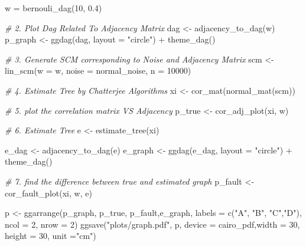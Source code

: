 \documentclass[
  10pt,
]{article}
\newenvironment{Shaded}{\begin{snugshade}}{\end{snugshade}}
\newcommand{\AttributeTok}[1]{\textcolor[rgb]{0.77,0.63,0.00}{#1}}
\newcommand{\CommentTok}[1]{\textcolor[rgb]{0.56,0.35,0.01}{\textit{#1}}}
\newcommand{\DecValTok}[1]{\textcolor[rgb]{0.00,0.00,0.81}{#1}}
\newcommand{\FloatTok}[1]{\textcolor[rgb]{0.00,0.00,0.81}{#1}}
\newcommand{\FunctionTok}[1]{\textcolor[rgb]{0.00,0.00,0.00}{#1}}
\newcommand{\NormalTok}[1]{#1}
\newcommand{\OtherTok}[1]{\textcolor[rgb]{0.56,0.35,0.01}{#1}}
\newcommand{\SpecialCharTok}[1]{\textcolor[rgb]{0.00,0.00,0.00}{#1}}
\newcommand{\StringTok}[1]{\textcolor[rgb]{0.31,0.60,0.02}{#1}}
\begin{document}
\begin{Shaded}
\begin{Highlighting}[]
\NormalTok{w }\OtherTok{=} \FunctionTok{bernouli\_dag}\NormalTok{(}\DecValTok{10}\NormalTok{, }\FloatTok{0.4}\NormalTok{)}

\CommentTok{\# 2. Plot Dag Related To Adjacency Matrix}
\NormalTok{dag }\OtherTok{\textless{}{-}} \FunctionTok{adjacency\_to\_dag}\NormalTok{(w)}
\NormalTok{p\_graph }\OtherTok{\textless{}{-}} \FunctionTok{ggdag}\NormalTok{(dag, }\AttributeTok{layout =} \StringTok{"circle"}\NormalTok{) }\SpecialCharTok{+} \FunctionTok{theme\_dag}\NormalTok{()}

\CommentTok{\# 3. Generate SCM corresponding to Noise and Adjacency Matrix}
\NormalTok{scm }\OtherTok{\textless{}{-}} \FunctionTok{lin\_scm}\NormalTok{(}\AttributeTok{w =}\NormalTok{ w, }\AttributeTok{noise =}\NormalTok{ normal\_noise, }\AttributeTok{n =} \DecValTok{10000}\NormalTok{)}

\CommentTok{\# 4. Estimate Tree by Chatterjee Algorithms}
\NormalTok{xi }\OtherTok{\textless{}{-}} \FunctionTok{cor\_mat}\NormalTok{(}\FunctionTok{normal\_mat}\NormalTok{(scm))}

\CommentTok{\# 5. plot the correlation matrix VS Adjacency}
\NormalTok{p\_true }\OtherTok{\textless{}{-}} \FunctionTok{cor\_adj\_plot}\NormalTok{(xi, w)}

\CommentTok{\# 6. Estimate Tree}
\NormalTok{e }\OtherTok{\textless{}{-}} \FunctionTok{estimate\_tree}\NormalTok{(xi)}

\NormalTok{e\_dag }\OtherTok{\textless{}{-}} \FunctionTok{adjacency\_to\_dag}\NormalTok{(e)}
\NormalTok{e\_graph }\OtherTok{\textless{}{-}} \FunctionTok{ggdag}\NormalTok{(e\_dag, }\AttributeTok{layout =} \StringTok{"circle"}\NormalTok{) }\SpecialCharTok{+} \FunctionTok{theme\_dag}\NormalTok{()}

\CommentTok{\# 7. find the difference between true and estimated graph}
\NormalTok{p\_fault }\OtherTok{\textless{}{-}} \FunctionTok{cor\_fault\_plot}\NormalTok{(xi, w, e)}


\NormalTok{p }\OtherTok{\textless{}{-}} \FunctionTok{ggarrange}\NormalTok{(p\_graph, p\_true, p\_fault,e\_graph,}
          \AttributeTok{labels =} \FunctionTok{c}\NormalTok{(}\StringTok{"A"}\NormalTok{, }\StringTok{"B"}\NormalTok{, }\StringTok{"C"}\NormalTok{,}\StringTok{"D"}\NormalTok{),}
          \AttributeTok{ncol =} \DecValTok{2}\NormalTok{, }\AttributeTok{nrow =} \DecValTok{2}\NormalTok{)}
\FunctionTok{ggsave}\NormalTok{(}\StringTok{"plots/graph.pdf"}\NormalTok{, p, }\AttributeTok{device =}\NormalTok{ cairo\_pdf,}\AttributeTok{width =} \DecValTok{30}\NormalTok{, }\AttributeTok{height =} \DecValTok{30}\NormalTok{, }\AttributeTok{unit =}\StringTok{"cm"}\NormalTok{)}
\end{Highlighting}
\end{Shaded}
\end{document}
